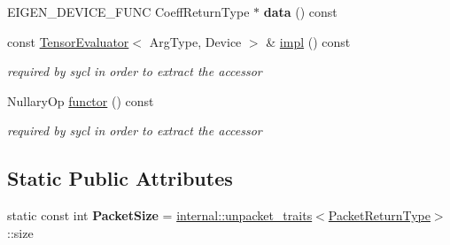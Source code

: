 \begin{DoxyCompactItemize}
E\+I\+G\+E\+N\+\_\+\+D\+E\+V\+I\+C\+E\+\_\+\+F\+U\+NC Coeff\+Return\+Type $\ast$ {\bfseries data} () const
\item 
\mbox{\label{struct_eigen_1_1_tensor_evaluator_3_01const_01_tensor_cwise_nullary_op_3_01_nullary_op_00_01_arg_type_01_4_00_01_device_01_4_a72a3fd3dcff859c87f7eb5d634d35f21}} 
const \hyperlink{struct_eigen_1_1_tensor_evaluator}{Tensor\+Evaluator}$<$ Arg\+Type, Device $>$ \& \hyperlink{struct_eigen_1_1_tensor_evaluator_3_01const_01_tensor_cwise_nullary_op_3_01_nullary_op_00_01_arg_type_01_4_00_01_device_01_4_a72a3fd3dcff859c87f7eb5d634d35f21}{impl} () const
\begin{DoxyCompactList}\small\item\em required by sycl in order to extract the accessor \end{DoxyCompactList}\item 
\mbox{\label{struct_eigen_1_1_tensor_evaluator_3_01const_01_tensor_cwise_nullary_op_3_01_nullary_op_00_01_arg_type_01_4_00_01_device_01_4_a9526ddfd7e9532ffdcb3e3ff8defb11f}} 
Nullary\+Op \hyperlink{struct_eigen_1_1_tensor_evaluator_3_01const_01_tensor_cwise_nullary_op_3_01_nullary_op_00_01_arg_type_01_4_00_01_device_01_4_a9526ddfd7e9532ffdcb3e3ff8defb11f}{functor} () const
\begin{DoxyCompactList}\small\item\em required by sycl in order to extract the accessor \end{DoxyCompactList}\end{DoxyCompactItemize}
\subsection*{Static Public Attributes}
\begin{DoxyCompactItemize}
\item 
\mbox{\label{struct_eigen_1_1_tensor_evaluator_3_01const_01_tensor_cwise_nullary_op_3_01_nullary_op_00_01_arg_type_01_4_00_01_device_01_4_accc3ab323a019fa05c8bbe826d02b991}} 
static const int {\bfseries Packet\+Size} = \hyperlink{struct_eigen_1_1internal_1_1unpacket__traits}{internal\+::unpacket\+\_\+traits}$<$\hyperlink{group___sparse_core___module}{Packet\+Return\+Type}$>$\+::size
\end{DoxyCompactItemize}


